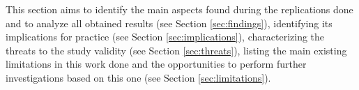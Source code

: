 This section aims to identify the main aspects found during the replications done and to analyze all obtained results (see Section \ref{sec:findings}), identifying its implications for practice (see Section \ref{sec:implications}), characterizing the threats to the study validity (see Section \ref{sec:threats}), listing the main existing limitations in this work done and the opportunities to perform further investigations based on this one (see Section \ref{sec:limitations}).